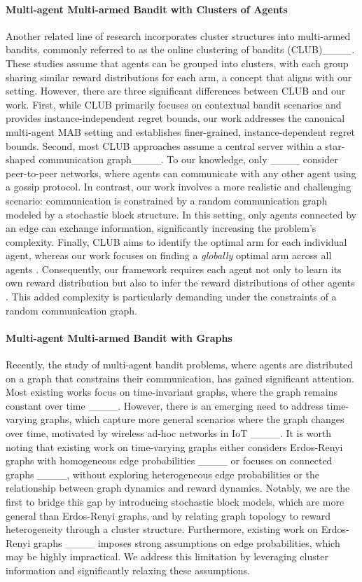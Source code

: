 \paragraph{Multi-agent Multi-armed Bandit with Clusters of Agents} 
Another related line of research incorporates cluster structures into multi-armed bandits, commonly referred to as the online clustering of bandits (CLUB)____. These studies assume that agents can be grouped into clusters, with each group sharing similar reward distributions for each arm, a concept that aligns with our setting. However, there are three significant differences between CLUB and our work.
First, while CLUB primarily focuses on contextual bandit scenarios and provides instance-independent regret bounds, our work addresses the canonical multi-agent MAB setting and establishes finer-grained, instance-dependent regret bounds.
Second, most CLUB approaches assume a central server within a star-shaped communication graph____. To our knowledge, only ____ consider peer-to-peer networks, where agents can communicate with any other agent using a gossip protocol. In contrast, our work involves a more realistic and challenging scenario: communication is constrained by a random communication graph modeled by a stochastic block structure. In this setting, only agents connected by an edge can exchange information, significantly increasing the problem's complexity.
Finally, CLUB aims to identify the optimal arm for each individual agent, whereas our work focuses on finding a \textit{globally} optimal arm across all agents . Consequently, our framework requires each agent not only to learn its own reward distribution but also to infer the reward distributions of other agents . This added complexity is particularly demanding under the constraints of a random communication graph.



\paragraph{Multi-agent Multi-armed Bandit with Graphs} 
Recently, the study of multi-agent bandit problems, where agents are distributed on a graph that constrains their communication, has gained significant attention. Most existing works focus on time-invariant graphs, where the graph remains constant over time ____. However, there is an emerging need to address time-varying graphs, which capture more general scenarios where the graph changes over time, motivated by wireless ad-hoc networks in IoT ____. It is worth noting that existing work on time-varying graphs either considers Erdos-Renyi graphs with homogeneous edge probabilities ____ or focuses on connected graphs ____, without exploring heterogeneous edge probabilities or the relationship between graph dynamics and reward dynamics. Notably, we are the first to bridge this gap by introducing stochastic block models, which are more general than Erdos-Renyi graphs, and by relating graph topology to reward heterogeneity through a cluster structure. Furthermore, existing work on Erdos-Renyi graphs ____ imposes strong assumptions on edge probabilities, which may be highly impractical. We address this limitation by leveraging cluster information and significantly relaxing these assumptions.


